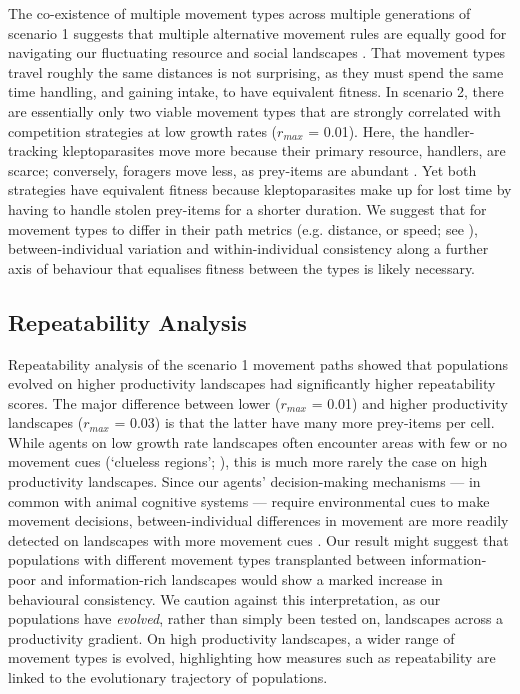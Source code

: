     The co-existence of multiple movement types across multiple generations of scenario 1 suggests that multiple alternative movement rules are equally good for navigating our fluctuating resource and social landscapes \citep[see also][]{getz2015,netz2021}.
    That movement types travel roughly the same distances is not surprising, as they must spend the same time handling, and gaining intake, to have equivalent fitness.
    In scenario 2, there are essentially only two viable movement types that are strongly correlated with competition strategies at low growth rates ($r_{max}$ = 0.01).
    Here, the handler-tracking kleptoparasites move more because their primary resource, handlers, are scarce; conversely, foragers move less, as prey-items are abundant \citep[see][]{gupte2021a}.
    Yet both strategies have equivalent fitness because kleptoparasites make up for lost time by having to handle stolen prey-items for a shorter duration.
    We suggest that for movement types to differ in their path metrics (e.g. distance, or speed; see \citealt{abrahms2017}), between-individual variation and within-individual consistency along a further axis of behaviour that equalises fitness between the types is likely necessary.
    
    \subsection*{Repeatability Analysis}
    
    Repeatability analysis of the scenario 1 movement paths showed that populations evolved on higher productivity landscapes had significantly higher repeatability scores.
    The major difference between lower ($r_{max}$ = 0.01) and higher productivity landscapes ($r_{max}$ = 0.03) is that the latter have many more prey-items per cell.
    While agents on low growth rate landscapes often encounter areas with few or no movement cues (`clueless regions'; \citealt{perkins1992}), this is much more rarely the case on high productivity landscapes.
    Since our agents' decision-making mechanisms --- in common with animal cognitive systems --- require environmental cues to make movement decisions, between-individual differences in movement are more readily detected on landscapes with more movement cues \citep[see][]{carter2013a}.
    Our result might suggest that populations with different movement types transplanted between information-poor and information-rich landscapes would show a marked increase in behavioural consistency.
    We caution against this interpretation, as our populations have \textit{evolved}, rather than simply been tested on, landscapes across a productivity gradient.
    On high productivity landscapes, a wider range of movement types is evolved, highlighting how measures such as repeatability are linked to the evolutionary trajectory of populations.
    
